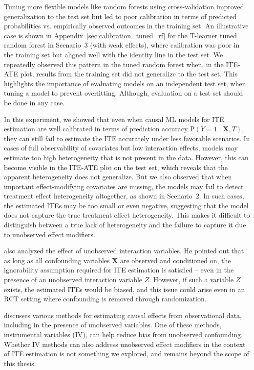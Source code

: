 \medskip


Tuning more flexible models like random forests using cross-validation improved generalization to the test set but led to poor calibration in terms of predicted probabilities vs. empirically observed outcomes in the training set. An illustrative case is shown in Appendix~\ref{sec:calibration_tuned_rf} for the T-learner tuned random forest in Scenario~3 (with weak effects), where calibration was poor in the training set but aligned well with the identity line in the test set. We repeatedly observed this pattern in the tuned random forest when, in the ITE-ATE plot, results from the training set did not generalize to the test set. This highlights the importance of evaluating models on an independent test set, when tuning a model to prevent overfitting. Although, evaluation on a test set should be done in any case.

\medskip

In this experiment, we showed that even when causal ML models for ITE estimation are well calibrated in terms of prediction accuracy $\text{P}(Y = 1 \mid \mathbf{X}, T)$, they can still fail to estimate the ITE accurately under less favorable scenarios. In cases of full observability of covariates but low interaction effects, models may estimate too high heterogeneity that is not present in the data. However, this can become visible in the ITE-ATE plot on the test set, which reveals that the apparent heterogeneity does not generalize. 
But we also observed that when important effect-modifying covariates are missing, the models may fail to detect treatment effect heterogeneity altogether, as shown in Scenario~2. In such cases, the estimated ITEs may be too small or even negative, suggesting that the model does not capture the true treatment effect heterogeneity. This makes it difficult to distinguish between a true lack of heterogeneity and the failure to capture it due to unobserved effect modifiers.


\citet{vegetabile2021} also analyzed the effect of unobserved interaction variables. He pointed out that as long as all confounding variables $\mathbf{X}$ are observed and conditioned on, the ignorability assumption required for ITE estimation is satisfied -- even in the presence of an unobserved interaction variable $Z$. However, if such a variable $Z$ exists, the estimated ITEs would be biased, and this issue could arise even in an RCT setting where confounding is removed through randomization.

\citet{nichols2007} discusses various methods for estimating causal effects from observational data, including in the presence of unobserved variables. One of these methods, instrumental variables (IV), can help reduce bias from unobserved confounding. Whether IV methods can also address unobserved effect modifiers in the context of ITE estimation is not something we explored, and remains beyond the scope of this thesis.



